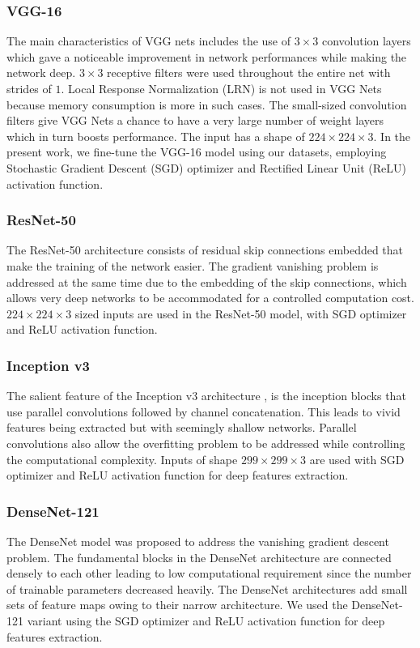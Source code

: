 \documentclass{llncs}
\begin{document}
\subsubsection{VGG-16}
The main characteristics of VGG nets \cite{simonyan2014very} includes the use of $3\times3$ convolution layers which gave a noticeable improvement in network performances while making the network deep. $3\times3$ receptive filters were used throughout the entire net with strides of $1$. Local Response Normalization (LRN) is not used in VGG Nets because memory consumption is more in such cases. The small-sized convolution filters give VGG Nets a chance to have a very large number of weight layers which in turn boosts performance. The input has a shape of $224\times224\times3$. In the present work, we fine-tune the VGG-16 model using our datasets, employing Stochastic Gradient Descent (SGD) optimizer and Rectified Linear Unit (ReLU) activation function.
\subsubsection{ResNet-50}
The ResNet-50 architecture \cite{he2016deep} consists of residual skip connections embedded that make the training of the network easier. The gradient vanishing problem is addressed at the same time due to the embedding of the skip connections, which allows very deep networks to be accommodated for a controlled computation cost. $224\times224\times3$ sized inputs are used in the ResNet-50 model, with SGD optimizer and ReLU activation function.
\subsubsection{Inception v3}
The salient feature of the Inception v3 architecture \cite{szegedy2016rethinking}, is the inception blocks that use parallel convolutions followed by channel concatenation. This leads to vivid features being extracted but with seemingly shallow networks. Parallel convolutions also allow the overfitting problem to be addressed while controlling the computational complexity. Inputs of shape $299\times299\times3$ are used with SGD optimizer and ReLU activation function for deep features extraction.
\subsubsection{DenseNet-121}
The DenseNet model \cite{huang2017densely} was proposed to address the vanishing gradient descent problem. The fundamental blocks in the DenseNet architecture are connected densely to each other leading to low computational requirement since the number of trainable parameters decreased heavily. The DenseNet architectures add small sets of feature maps owing to their narrow architecture. We used the DenseNet-121 variant using the SGD optimizer and ReLU activation function for deep features extraction.
\end{document}

